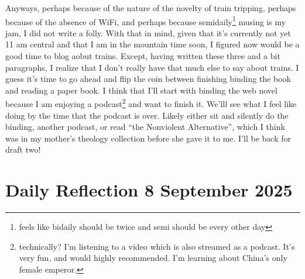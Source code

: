 \documentclass[12pt]{article}
\newcommand{\say}[1]{``#1''}
\renewcommand{\,}{\textsuperscript{,}}
\begin{document}
Anyways, perhaps because of the nature of the novelty of train tripping, perhaps because of the absence of WiFi, and perhaps because semidaily\footnote{feels like bidaily should be twice and semi should be every other day} musing is my jam, I did not write a folly.
With that in mind, given that it's currently not yet 11 am central and that I am in the mountain time soon, I figured now would be a good time to blog aobut trains.
Except, having written these three and a bit paragraphs, I realize that I don't really have that much else to say about trains.
I guess it's time to go ahead and flip the coin between finishing binding the book and reading a paper book.
I think that I'll start with binding the web novel because I am enjoying a podcast\footnote{technically? I'm listening to a video which is also streamed as a podcast. It's very fun, and would highly recommended. I'm learning about China's only female emperor.} and want to finish it.
We'lll see what I feel like doing by the time that the podcast is over.
Likely either sit and silently do the binding, another podcast, or read \say{the Nonviolent Alternative}, which I think was in my mother's theology collection before she gave it to me.
I'll be back for draft two!
\section{Daily Reflection 8 September 2025}
\end{document}

